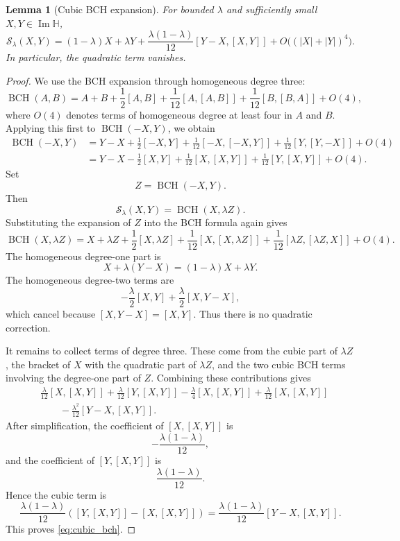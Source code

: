 \documentclass[a4paper,11pt]{article}
\newcommand{\bH}{\mathbb{H}}
\newcommand{\BCH}{\operatorname{BCH}}
\newcommand{\ImH}{\operatorname{Im}\bH}
\numberwithin{equation}{section}
\theoremstyle{plain}
\newtheorem{lemma}[thm]{Lemma}
\theoremstyle{definition}
\theoremstyle{remark}
\begin{document}
\begin{lemma}[Cubic BCH expansion]
\label{lem:cubic_bch}
For bounded \(\lambda\) and sufficiently small \(X,Y\in\ImH\),
\begin{equation}
\label{eq:cubic_bch}
\mathcal S_\lambda(X,Y)
=
(1-\lambda)X+\lambda Y
+
\frac{\lambda(1-\lambda)}{12}
        [Y-X,[X,Y]]
+
O\bigl((|X|+|Y|)^4\bigr).
\end{equation}
In particular, the quadratic term vanishes.
\end{lemma}

\begin{proof}
We use the BCH expansion through homogeneous degree three:
\[
\BCH(A,B)
=
A+B+\frac12[A,B]
+\frac1{12}[A,[A,B]]
+\frac1{12}[B,[B,A]]
+O(4),
\]
where \(O(4)\) denotes terms of homogeneous degree at least four in \(A\) and
\(B\).  Applying this first to \(\BCH(-X,Y)\), we obtain
\[
\begin{aligned}
\BCH(-X,Y)
&=
Y-X+\frac12[-X,Y]
+\frac1{12}[-X,[-X,Y]]
+\frac1{12}[Y,[Y,-X]]
+O(4)  \\
&=
Y-X-\frac12[X,Y]
+\frac1{12}[X,[X,Y]]
+\frac1{12}[Y,[X,Y]]
+O(4).
\end{aligned}
\]
Set
\[
        Z=\BCH(-X,Y).
\]
Then
\[
        \mathcal S_\lambda(X,Y)=\BCH(X,\lambda Z).
\]
Substituting the expansion of \(Z\) into the BCH formula again gives
\[
\BCH(X,\lambda Z)
=
X+\lambda Z
+\frac12[X,\lambda Z]
+\frac1{12}[X,[X,\lambda Z]]
+\frac1{12}[\lambda Z,[\lambda Z,X]]
+O(4).
\]
The homogeneous degree-one part is
\[
        X+\lambda(Y-X)=(1-\lambda)X+\lambda Y.
\]
The homogeneous degree-two terms are
\[
        -\frac{\lambda}{2}[X,Y]
        +
        \frac{\lambda}{2}[X,Y-X],
\]
which cancel because \([X,Y-X]=[X,Y]\).  Thus there is no quadratic
correction.

It remains to collect terms of degree three.  These come from the cubic part
of \(\lambda Z\), the bracket of \(X\) with the quadratic part of
\(\lambda Z\), and the two cubic BCH terms involving the degree-one part of
\(Z\).  Combining these contributions gives
\[
\begin{aligned}
&\frac{\lambda}{12}[X,[X,Y]]
+\frac{\lambda}{12}[Y,[X,Y]]
-\frac{\lambda}{4}[X,[X,Y]]
+\frac{\lambda}{12}[X,[X,Y]]       \\
&\qquad
-\frac{\lambda^2}{12}[Y-X,[X,Y]] .
\end{aligned}
\]
After simplification, the coefficient of \([X,[X,Y]]\) is
\[
        -\frac{\lambda(1-\lambda)}{12},
\]
and the coefficient of \([Y,[X,Y]]\) is
\[
        \frac{\lambda(1-\lambda)}{12}.
\]
Hence the cubic term is
\[
        \frac{\lambda(1-\lambda)}{12}
        \left(
        [Y,[X,Y]]-[X,[X,Y]]
        \right)
        =
        \frac{\lambda(1-\lambda)}{12}
        [Y-X,[X,Y]].
\]
This proves \eqref{eq:cubic_bch}.
\end{proof}
\end{document}
